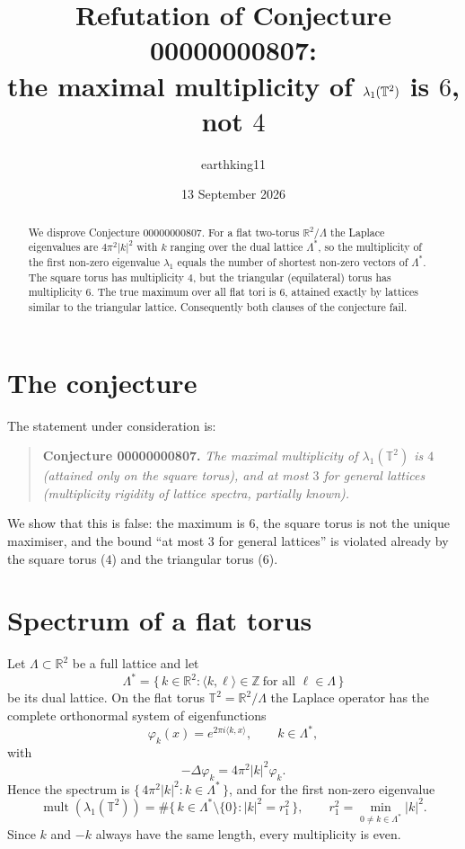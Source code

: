 \documentclass[11pt]{article}
\title{Refutation of Conjecture 00000000807:\\ the maximal multiplicity of $\lambda_1(\T^2)$ is $6$, not $4$}
\author{earthking11}
\date{13 September 2026}
\theoremstyle{definition}
\newcommand{\R}{\mathbb{R}}
\newcommand{\Z}{\mathbb{Z}}
\newcommand{\T}{\mathbb{T}}
\newcommand{\Lam}{\Lambda}
\newcommand{\inner}[2]{\langle #1, #2\rangle}
\begin{document}
\maketitle

\begin{abstract}
We disprove Conjecture 00000000807.  For a flat two-torus $\R^2/\Lam$ the
Laplace eigenvalues are $4\pi^2|k|^2$ with $k$ ranging over the dual lattice
$\Lam^{*}$, so the multiplicity of the first non-zero eigenvalue $\lambda_1$
equals the number of shortest non-zero vectors of $\Lam^{*}$.  The square
torus has multiplicity $4$, but the triangular (equilateral) torus has
multiplicity $6$.  The true maximum over all flat tori is $6$, attained
exactly by lattices similar to the triangular lattice.  Consequently both
clauses of the conjecture fail.
\end{abstract}

\section{The conjecture}

The statement under consideration is:
\begin{quote}
\textbf{Conjecture 00000000807.} \emph{The maximal multiplicity of
$\lambda_1(\T^2)$ is $4$ (attained only on the square torus), and at most
$3$ for general lattices (multiplicity rigidity of lattice spectra,
partially known).}
\end{quote}
We show that this is false: the maximum is $6$, the square torus is not the
unique maximiser, and the bound ``at most $3$ for general lattices'' is
violated already by the square torus ($4$) and the triangular torus ($6$).

\section{Spectrum of a flat torus}\label{sec:spectrum}

Let $\Lam \subset \R^2$ be a full lattice and let
\[
  \Lam^{*} = \{\, k \in \R^2 : \inner{k}{\ell} \in \Z \ \text{for all } \ell \in \Lam \,\}
\]
be its dual lattice.  On the flat torus $\T^2 = \R^2/\Lam$ the Laplace
operator has the complete orthonormal system of eigenfunctions
\[
  \varphi_k(x) = e^{2\pi i \inner{k}{x}}, \qquad k \in \Lam^{*},
\]
with
\[
  -\Delta \varphi_k = 4\pi^2 |k|^2 \varphi_k .
\]
Hence the spectrum is $\{\,4\pi^2|k|^2 : k \in \Lam^{*}\,\}$, and for the
first non-zero eigenvalue
\begin{equation}\label{eq:mult}
  \operatorname{mult}(\lambda_1(\T^2))
  = \#\{\, k \in \Lam^{*} \setminus \{0\} : |k|^2 = r_1^2 \,\},
  \qquad
  r_1^2 = \min_{0 \neq k \in \Lam^{*}} |k|^2 .
\end{equation}
Since $k$ and $-k$ always have the same length, every multiplicity is even.
\end{document}
